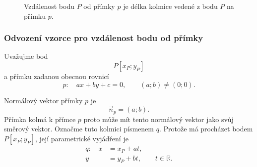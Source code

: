 \begin{figure}[H]
    \centering
    \caption{Vzdálenost bodu $P$ od přímky $p$ je délka kolmice
    vedené z bodu $P$ na přímku $p$.}
    \label{fig:Geometric_distance_point_line}
\end{figure}


\subsubsection{Odvození vzorce pro vzdálenost bodu od přímky}
\label{subsubsec:Derivation_distance_point_line}

Uvažujme bod
\[
    P[x_P;y_P]
\]
a přímku zadanou obecnou rovnicí
\begin{equation}\label{eq:Distance_general_line}
    p:\quad ax+by+c=0,
    \qquad
    (a;b)\neq(0;0).
\end{equation}

Normálový vektor přímky $p$ je
\[
    \vec{n}_p=(a;b).
\]
Přímka kolmá k přímce $p$ proto může mít tento normálový vektor jako
svůj směrový vektor. Označme tuto kolmici písmenem $q$. Protože má
procházet bodem $P[x_P;y_P]$, její parametrické vyjádření je
\begin{equation}\label{eq:Perpendicular_through_point_distance}
    \begin{aligned}
        q:\quad x&=x_P+at,\\
                 y&=y_P+bt,
                 \qquad t\in\mathbb{R}.
    \end{aligned}
\end{equation}


